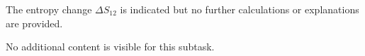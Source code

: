 The entropy change \( \Delta S_{12} \) is indicated but no further calculations or explanations are provided.  

No additional content is visible for this subtask.